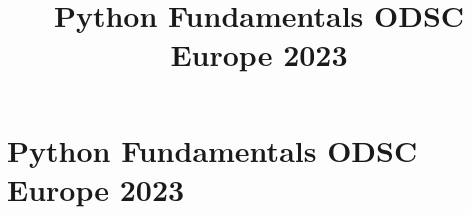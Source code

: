 
\title[Python Fundamentals ODSC Europe 2023]{Python Fundamentals ODSC Europe 2023} 



\section{Python Fundamentals ODSC Europe 2023}
\begin{Slide}{}
  \titlepage
\end{Slide}






